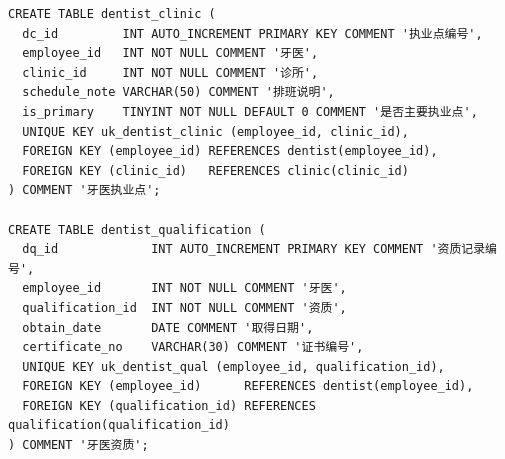 \documentclass[11pt,a4paper]{ctexart}
\begin{document}
\begin{lstlisting}[style=sql]
CREATE TABLE dentist_clinic (
  dc_id         INT AUTO_INCREMENT PRIMARY KEY COMMENT '执业点编号',
  employee_id   INT NOT NULL COMMENT '牙医',
  clinic_id     INT NOT NULL COMMENT '诊所',
  schedule_note VARCHAR(50) COMMENT '排班说明',
  is_primary    TINYINT NOT NULL DEFAULT 0 COMMENT '是否主要执业点',
  UNIQUE KEY uk_dentist_clinic (employee_id, clinic_id),
  FOREIGN KEY (employee_id) REFERENCES dentist(employee_id),
  FOREIGN KEY (clinic_id)   REFERENCES clinic(clinic_id)
) COMMENT '牙医执业点';

CREATE TABLE dentist_qualification (
  dq_id             INT AUTO_INCREMENT PRIMARY KEY COMMENT '资质记录编号',
  employee_id       INT NOT NULL COMMENT '牙医',
  qualification_id  INT NOT NULL COMMENT '资质',
  obtain_date       DATE COMMENT '取得日期',
  certificate_no    VARCHAR(30) COMMENT '证书编号',
  UNIQUE KEY uk_dentist_qual (employee_id, qualification_id),
  FOREIGN KEY (employee_id)      REFERENCES dentist(employee_id),
  FOREIGN KEY (qualification_id) REFERENCES qualification(qualification_id)
) COMMENT '牙医资质';
\end{lstlisting}
\end{document}
